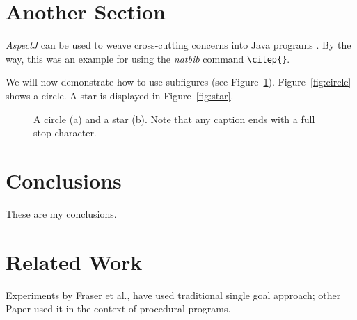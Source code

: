 \documentclass[pdftex,english,oribibl]{llncs}
\begin{document}
\section{Another Section}\label{sec:anotherSection}

  \textit{AspectJ} can be used to weave cross-cutting concerns into Java programs \citep{AspectJ2007}. By the way, this was an example for using the \textit{natbib} command \texttt{\textbackslash{}citep\{\}}.

  We will now demonstrate how to use subfigures (see Figure~\ref{fig:subfig}). Figure~\ref{fig:circle} shows a circle. A star is displayed in Figure~\ref{fig:star}.

  \begin{figure}
    \centering
    \caption{A circle (a) and a star (b). Note that any caption ends with a full stop character.}
    \label{fig:subfig}
  \end{figure}

\section{Conclusions}\label{sec:conclusions}

  These are my conclusions.
\section{Related Work}
Experiments by Fraser et al., have used traditional single goal approach; other Paper used it in the context of procedural programs.

\end{document}

